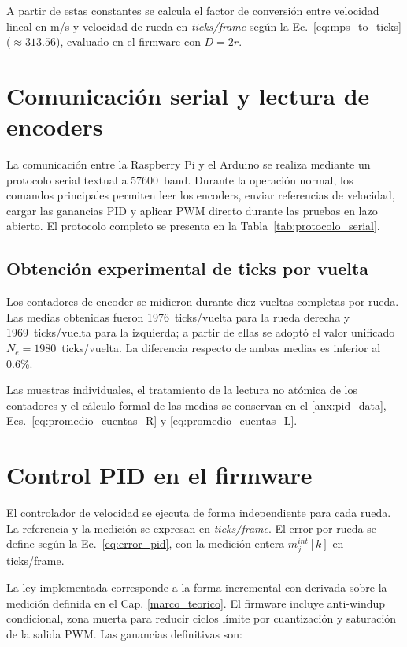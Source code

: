 A partir de estas constantes se calcula el factor de conversión entre velocidad lineal en m/s y velocidad de rueda en \textit{ticks/frame} según la Ec.~\ref{eq:mps_to_ticks} ($\approx 313.56$), evaluado en el firmware con $D=2r$.

\section{Comunicación serial y lectura de encoders}
\label{sec:serial_firmware}

La comunicación entre la Raspberry Pi y el \gls{Arduino} se realiza mediante un protocolo serial textual a 57600~baud. Durante la operación normal, los comandos principales permiten leer los encoders, enviar referencias de velocidad, cargar las ganancias PID y aplicar PWM directo durante las pruebas en lazo abierto. El protocolo completo se presenta en la Tabla~\ref{tab:protocolo_serial}.

\subsection{Obtención experimental de ticks por vuelta}
\label{sec:cpr_experimental}

Los contadores de encoder se midieron durante diez vueltas completas por
rueda. Las medias obtenidas fueron 1976~ticks/vuelta para la rueda derecha y
1969~ticks/vuelta para la izquierda; a partir de ellas se adoptó el valor
unificado $N_e=1980$~ticks/vuelta. La diferencia respecto de ambas medias es
inferior al 0.6\%.

Las muestras individuales, el tratamiento de la lectura no atómica de los
contadores y el cálculo formal de las medias se conservan en el
\ref{anx:pid_data}, Ecs.~\eqref{eq:promedio_cuentas_R} y
\eqref{eq:promedio_cuentas_L}.

\section{Control PID en el firmware}
\label{sec:motorcontrol_pid}

El controlador de velocidad se ejecuta de forma independiente para cada rueda. La referencia y la medición se expresan en \textit{ticks/frame}. El error por rueda se define según la Ec.~\ref{eq:error_pid}, con la medición entera $m_j^{int}[k]$ en ticks/frame.

La ley implementada corresponde a la forma incremental con derivada sobre la medición definida en el Cap. \ref{marco_teorico}. El firmware incluye anti-windup condicional, zona muerta para reducir ciclos límite por cuantización y saturación de la salida PWM. Las ganancias definitivas son:

